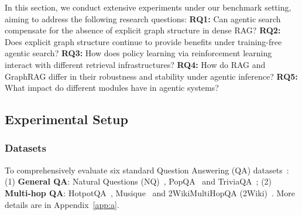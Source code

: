 In this section, we conduct extensive experiments under our benchmark setting, aiming to address the following research questions: \textbf{RQ1:} Can agentic search compensate for the absence of explicit graph structure in dense RAG? \textbf{RQ2:} Does explicit graph structure continue to provide benefits under training-free agentic search? \textbf{RQ3:} How does policy learning via reinforcement learning interact with different retrieval infrastructures? \textbf{RQ4:} How do RAG and GraphRAG differ in their robustness and stability under agentic inference? \textbf{RQ5:} What impact do different modules have in agentic systems?




\subsection{Experimental Setup}
\subsubsection{\textbf{Datasets}}
To comprehensively evaluate six standard Question Answering (QA) datasets~\cite{FlashRAG}: (1) \textbf{General QA}: Natural Questions (NQ)~\cite{nq}, PopQA~\cite{popqa} and TriviaQA~\cite{triviaqa}; (2) \textbf{Multi-hop QA}: HotpotQA~\cite{hotpotqa}, Musique~\cite{musique} and 2WikiMultiHopQA (2Wiki)~\cite{2wiki}. More details are in Appendix~\ref{app:a}.

